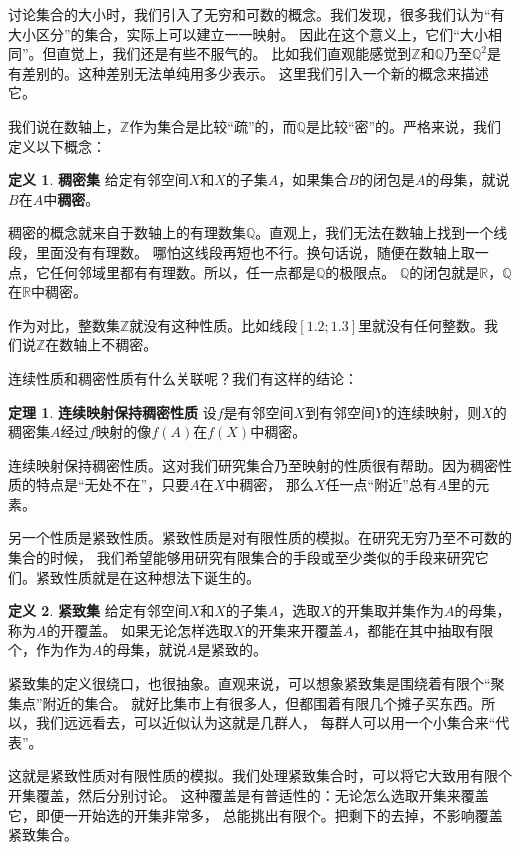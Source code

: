 \documentclass[12pt,UTF8]{ctexbook}
\theoremstyle{definition}
\newtheorem{df}{定义}[section]
\newtheorem{tm}{定理}[section]
\theoremstyle{plain}
\begin{document}
讨论集合的大小时，我们引入了无穷和可数的概念。我们发现，很多我们认为“有大小区分”的集合，实际上可以建立一一映射。
因此在这个意义上，它们“大小相同”。但直觉上，我们还是有些不服气的。
比如我们直观能感觉到$\mathbb{Z}$和$\mathbb{Q}$乃至$\mathbb{Q}^2$是有差别的。这种差别无法单纯用多少表示。
这里我们引入一个新的概念来描述它。

我们说在数轴上，$\mathbb{Z}$作为集合是比较“疏”的，而$\mathbb{Q}$是比较“密”的。严格来说，我们定义以下概念：
\begin{df}{\textbf{稠密集}}
    给定有邻空间$X$和$X$的子集$A$，如果集合$B$的闭包是$A$的母集，就说$B$在$A$中\textbf{稠密}。
\end{df}

稠密的概念就来自于数轴上的有理数集$\mathbb{Q}$。直观上，我们无法在数轴上找到一个线段，里面没有有理数。
哪怕这线段再短也不行。换句话说，随便在数轴上取一点，它任何邻域里都有有理数。所以，任一点都是$\mathbb{Q}$的极限点。
$\mathbb{Q}$的闭包就是$\mathbb{R}$，$\mathbb{Q}$在$\mathbb{R}$中稠密。

作为对比，整数集$\mathbb{Z}$就没有这种性质。比如线段$[1.2;1.3]$里就没有任何整数。我们说$\mathbb{Z}$在数轴上不稠密。

连续性质和稠密性质有什么关联呢？我们有这样的结论：
\begin{tm}{\textbf{连续映射保持稠密性质}}
    设$f$是有邻空间$X$到有邻空间$Y$的连续映射，则$X$的稠密集$A$经过$f$映射的像$f(A)$在$f(X)$中稠密。
\end{tm}
连续映射保持稠密性质。这对我们研究集合乃至映射的性质很有帮助。因为稠密性质的特点是“无处不在”，只要$A$在$X$中稠密，
那么$X$任一点“附近”总有$A$里的元素。


另一个性质是紧致性质。紧致性质是对有限性质的模拟。在研究无穷乃至不可数的集合的时候，
我们希望能够用研究有限集合的手段或至少类似的手段来研究它们。紧致性质就是在这种想法下诞生的。
\begin{df}{\textbf{紧致集}}
    给定有邻空间$X$和$X$的子集$A$，选取$X$的开集取并集作为$A$的母集，称为$A$的开覆盖。
    如果无论怎样选取$X$的开集来开覆盖$A$，都能在其中抽取有限个，作为作为$A$的母集，就说$A$是紧致的。
\end{df}

紧致集的定义很绕口，也很抽象。直观来说，可以想象紧致集是围绕着有限个“聚集点”附近的集合。
就好比集市上有很多人，但都围着有限几个摊子买东西。所以，我们远远看去，可以近似认为这就是几群人，
每群人可以用一个小集合来“代表”。

这就是紧致性质对有限性质的模拟。我们处理紧致集合时，可以将它大致用有限个开集覆盖，然后分别讨论。
这种覆盖是有普适性的：无论怎么选取开集来覆盖它，即便一开始选的开集非常多，
总能挑出有限个。把剩下的去掉，不影响覆盖紧致集合。
\end{document}
